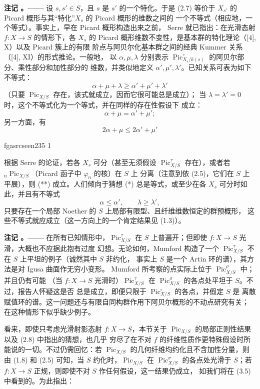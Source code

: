 \documentclass[12pt,twoside,openany]{book}
\numberwithin{equation}{section}
\newcommand{\fgaunitid}{unbound}
\newcommand{\src}[1]{%
  \phantomsection
  \hypertarget{src:\fgaunitid:#1}{}%
  \hypertarget{fga.\fgaunitid.p#1}{}%
  \ifcsname fgasrcseen#1\endcsname\else
    \expandafter\gdef\csname fgasrcseen#1\endcsname{1}%
    \hypertarget{src:#1}{}%
  \fi
  \marginpar{\raggedleft\footnotesize\sffamily #1}%
}
\theoremstyle{plain}
\theoremstyle{definition}
\theoremstyle{remark}
\newcommand{\result}[2]{%
  \par\medskip\noindent\textbf{#1%
  \if\relax\detokenize{#2}\relax\else\space#2\fi。——}\enspace
}
\begin{document}
\result{注记}{2.8} 设 $s,s'\in S$，且 $s$ 是 $s'$ 的一个特化。于是 (2.7)
等价于 $X_{s'}$ 的 Picard 概形与其“特化”$X_s$ 的 Picard 概形的维数之间的
一个不等式（相应地，一个等式）。事实上，早在 Picard 概形构造出来之前，
Serre 就已指出：在光滑态射 $f:X\longrightarrow S$ 的情形下，各 $X_s$ 的
Picard 概形维数不变性，是基本群的特化理论（[4], X）以及 Picard 簇上的有限
阶点与阿贝尔化基本群之间的经典 Kummer 关系（[4], XI）的形式推论。一般地，
以 $\alpha,\mu,\lambda$ 分别表示
$\operatorname{Pic}_{X_s/k(s)}^\circ$ 的阿贝尔部分、乘性部分和加性部分的
维数，并类似地定义 $\alpha',\mu',\lambda'$。已知关系可表为如下不等式：
\[
\tag{*}\alpha+\mu+\lambda\geq\alpha'+\mu'+\lambda'
\]
（只要 $\operatorname{Pic}_{X/S}$ 存在，该式就成立，因而它很可能总是成立）；
当 $\lambda=\lambda'=0$ 时，这个不等式化为一个等式，并在同样的存在性假设下
成立：
\[
\alpha+\mu=\alpha'+\mu' ;
\]
另一方面，有
\[
\tag{**}2\alpha+\mu\leq2\alpha'+\mu'
\]

\src{235}
根据 Serre 的论证，若各 $X_s$ 可分（甚至无须假设
$\operatorname{Pic}_{X/S}^\tau$ 存在），或者若
${}_n\operatorname{Pic}_{X/S}$（Picard 函子中 $\varphi_n$ 的核）在 $S$ 上
分离（注意到依 (2.5)，它们在 $S$ 上平展），则 (**) 成立。人们倾向于猜想
(*) 总是等式，或至少在各 $X_s$ 可分时如此，并且有不等式
\[
\tag{***}\alpha\leq\alpha',\qquad\lambda\geq\lambda',
\]
只要存在一个局部 Noether 的 $S$ 上局部有限型、且纤维维数恒定的群预概形，
这些不等式就应成立（这一方向上的一个肯定结果见 (1.3)）。

\result{注记}{2.9} 在所有已知情形中，$\operatorname{Pic}_{X/S}^\tau$ 在
$S$ 上普遍开；但即使 $f:X\longrightarrow S$ 光滑，大概也不应据此抱有过度
幻想。无论如何，Mumford 构造了一个
$\operatorname{Pic}_{X/S}^\tau$ 不在 $S$ 上平坦的例子（诚然其中 $S$ 非约化，
事实上 $S$ 是一个 Artin 环的谱），其方法是对 Igusa 曲面作无穷小变形。
Mumford 所考察的点实际上位于 $\operatorname{Pic}_{X/S}^\rho$ 中；并且仍有可能
（当 $f:X\longrightarrow S$ 光滑时）$\operatorname{Pic}_{X/S}^\tau$ 在
$\operatorname{Pic}_{X/S}^\sigma$ 的各点处平坦于 $S$。不过，报告人怀疑这是否
总是成立，即便只限于 $\operatorname{Pic}_{X/S}^\circ$ 的各点，并假定 $S$ 是
离散赋值环的谱。这一问题还与有限自同构群作用下阿贝尔概形的不动点研究有关；
在这种情形下似乎缺少例子。

看来，即使只考虑光滑射影态射 $f:X\longrightarrow S$，本节关于
$\operatorname{Pic}_{X/S}$ 的局部正则性结果以及 (2.8) 中指出的猜想，也几乎
穷尽了在不对 $f$ 的纤维性质作更特殊假设时所能说的一切。不过仍需回忆：若
$\operatorname{Pic}_{X/S}$ 的几何纤维均约化且不含加性分量，则由 (1.8) 和
(2.5) 可知，当 $S$ 约化时，$\operatorname{Pic}_{X/S}$ 在
$\operatorname{Pic}_{X/S}^\sigma$ 的各点处光滑于 $S$；若
$f:X\longrightarrow S$ 正规，则即使不对 $S$ 作任何假设，这一结果仍成立，
如我们将在 (3.5) 中看到的。为此指出：
\end{document}
